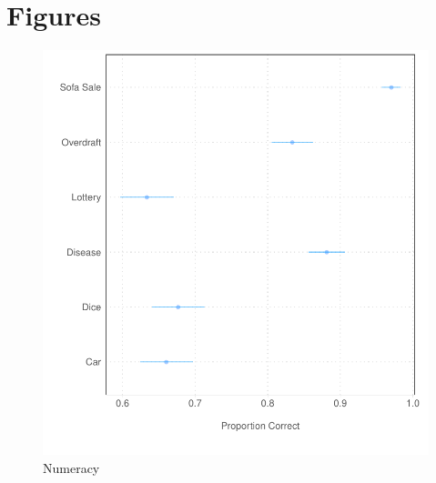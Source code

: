 \documentclass[12pt, letterpaper]{article}
\begin{document}
\section{Figures}

\begin{figure}[h]
    \centering
    \includegraphics{figs/lucid_numeracy.pdf}
    \caption{Numeracy}
    \label{fig:lucid_numeracy}
\end{figure}
\end{document}
